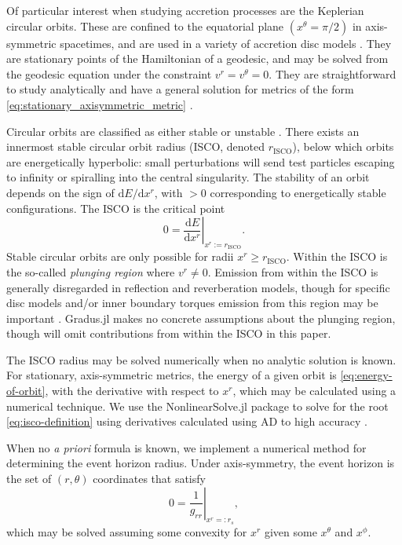 \documentclass[fleqn,usenatbib]{mnras}
\newcommand{\Gradus}{{\sc Gradus.jl}\xspace}
\renewcommand{\d}{\text{d}}
\newcommand{\risco}{r_\text{ISCO}}
\begin{document}
Of particular interest when studying accretion processes are the Keplerian
circular orbits. These are confined to the equatorial plane $(x^\theta = \pi/2)$
in axis-symmetric spacetimes, and are used in a variety of accretion disc models
\citep{shakura_black_1973, sadowski_relativistic_2011}. They are stationary
points of the Hamiltonian of a geodesic, and may be solved from the geodesic
equation under the constraint $v^r = v^\theta = 0$. They are straightforward to
study analytically and have a general solution for metrics of the form
\eqref{eq:stationary_axisymmetric_metric} \citep[see e.g.][and
an extension towards $a^\mu \neq 0$ in Appendix
\ref{appendix:circular-orbits}]{johannsen_regular_2013}.

Circular orbits are classified as either stable or unstable
\citep{wilkins_bound_1972,bardeen_rotating_1972}. There exists an innermost
stable circular orbit radius (ISCO, denoted $\risco$), below which orbits
are energetically hyperbolic: small perturbations will send test particles
escaping to infinity or spiralling into the central singularity. The stability of
an orbit depends on the sign of $\d E / \d x^r$, with $>0$ corresponding to
energetically stable configurations. The ISCO is the critical point
\begin{equation}
    \label{eq:isco-definition}
    0 = \left. \frac{\d E}{\d x^r} \right\rvert_{x^r := \risco}.
\end{equation}
Stable circular orbits are only possible for radii $x^r \geq \risco$. Within the
ISCO is the so-called \textit{plunging region} where $v^r \neq 0$. Emission from
within the ISCO is generally disregarded in reflection and reverberation models,
though for specific disc models and/or inner boundary torques emission from this
region may be important \citep[see e.g.][]{reynolds_isco_1997,young_isco_1998,
mummery_continuum_2024}.  \Gradus makes no concrete assumptions about the
plunging region, though will omit contributions from within the ISCO in this
paper.

The ISCO radius may be solved numerically when no analytic solution is known.
For stationary, axis-symmetric metrics, the energy of a given orbit is
\eqref{eq:energy-of-orbit}, with the derivative with respect to $x^r$, which may
be calculated using a numerical technique. We use the NonlinearSolve.jl package
to solve for the root \ref{eq:isco-definition} using derivatives calculated
using AD to high accuracy \citep{Pal_NonlinearSolve_jl_2023}.

When no \textit{a priori} formula is known, we implement a numerical method for
determining the event horizon radius.  Under axis-symmetry, the event horizon is
the set of $(r, \theta)$ coordinates that satisfy
\begin{equation}
    \label{eq:event_horizon}
    0 = \left. \frac{1}{g_{rr}} \right\rvert_{x^r =: r_s},
\end{equation}
which may be solved assuming some convexity for $x^r$ given some $x^\theta$ and
$x^\phi$.
\end{document}
